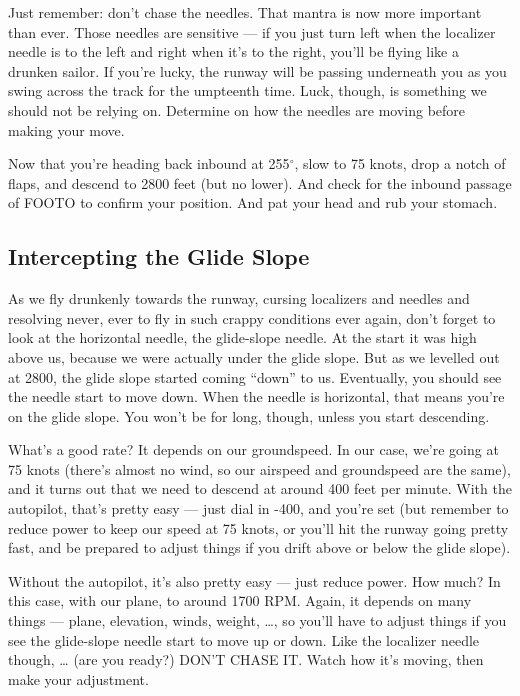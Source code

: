 Just remember: don't chase the needles.  That mantra is now more
important than ever.  Those needles are sensitive --- if you just turn
left when the localizer needle is to the left and right when it's to
the right, you'll be flying like a drunken sailor.  If you're lucky,
the runway will be passing underneath you as you swing across the
track for the umpteenth time.  Luck, though, is something we should
not be relying on.  Determine on how the needles are moving before
making your move.

Now that you're heading back inbound at 255$^\circ$, slow to 75 knots,
drop a notch of flaps, and descend to 2800 feet (but no
lower).  And check for the inbound passage of FOOTO to
confirm your position.  And pat your head and rub your stomach.

\subsection{Intercepting the Glide Slope}

As we fly drunkenly towards the runway, cursing localizers and needles
and resolving never, ever to fly in such crappy conditions ever again,
don't forget to look at the horizontal needle, the glide-slope needle.
At the start it was high above us, because we were actually under the
glide slope.  But as we levelled out at 2800, the glide slope started
coming ``down'' to us.  Eventually, you should see the needle start to
move down.  When the needle is horizontal, that means you're on the
glide slope.  You won't be for long, though, unless you start
descending.

What's a good rate?  It depends on our groundspeed.  In our case,
we're going at 75 knots (there's almost no wind, so our airspeed and
groundspeed are the same), and it turns out that we need to descend at
around 400 feet per minute.  With the autopilot, that's pretty easy
--- just dial in -400, and you're set (but remember to reduce power to
keep our speed at 75 knots, or you'll hit the runway going pretty
fast, and be prepared to adjust things if you drift above or below the
glide slope).

Without the autopilot, it's also pretty easy --- just reduce power.
How much?  In this case, with our plane, to around 1700 RPM.  Again,
it depends on many things --- plane, elevation, winds, weight,
\ldots{}, so you'll have to adjust things if you see the glide-slope
needle start to move up or down.  Like the localizer needle though,
\ldots{} (are you ready?)  DON'T CHASE IT.  Watch how it's moving,
then make your adjustment.

